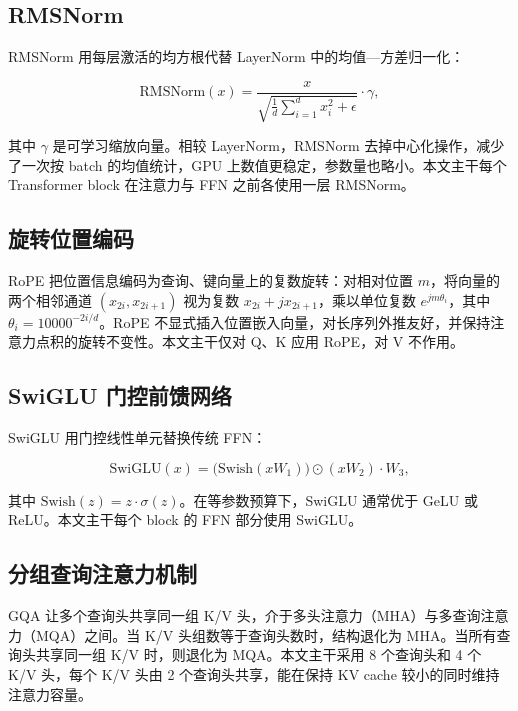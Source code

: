 \subsection{RMSNorm}

RMSNorm 用每层激活的均方根代替 LayerNorm 中的均值—方差归一化：

\begin{equation}
    \text{RMSNorm}(x) = \frac{x}{\sqrt{\frac{1}{d}\sum_{i=1}^{d} x_i^2 + \epsilon}} \cdot \gamma,
    \label{eq:rmsnorm}
\end{equation}

其中 $\gamma$ 是可学习缩放向量。相较 LayerNorm，RMSNorm 去掉中心化操作，减少了一次按 batch 的均值统计，GPU 上数值更稳定，参数量也略小。本文主干每个 Transformer block 在注意力与 FFN 之前各使用一层 RMSNorm。

\subsection{旋转位置编码}

RoPE\cite{su_2024_roformer} 把位置信息编码为查询、键向量上的复数旋转：对相对位置 $m$，将向量的两个相邻通道 $(x_{2i}, x_{2i+1})$ 视为复数 $x_{2i} + j x_{2i+1}$，乘以单位复数 $e^{j m \theta_i}$，其中 $\theta_i = 10000^{-2i/d}$。RoPE 不显式插入位置嵌入向量，对长序列外推友好，并保持注意力点积的旋转不变性。本文主干仅对 Q、K 应用 RoPE，对 V 不作用。

\subsection{SwiGLU 门控前馈网络}

SwiGLU 用门控线性单元替换传统 FFN：

\begin{equation}
    \text{SwiGLU}(x) = \big(\text{Swish}(x W_1)\big) \odot (x W_2) \cdot W_3,
    \label{eq:swiglu}
\end{equation}

其中 $\text{Swish}(z) = z \cdot \sigma(z)$。在等参数预算下，SwiGLU 通常优于 GeLU 或 ReLU。本文主干每个 block 的 FFN 部分使用 SwiGLU。

\subsection{分组查询注意力机制}

GQA 让多个查询头共享同一组 K/V 头，介于多头注意力（MHA）与多查询注意力（MQA）之间。当 K/V 头组数等于查询头数时，结构退化为 MHA。当所有查询头共享同一组 K/V 时，则退化为 MQA。本文主干采用 8 个查询头和 4 个 K/V 头，每个 K/V 头由 2 个查询头共享，能在保持 KV cache 较小的同时维持注意力容量。

